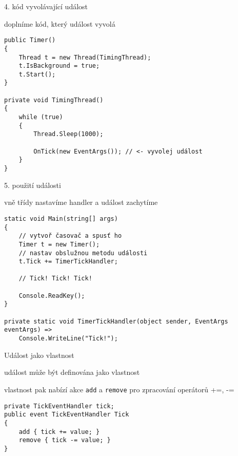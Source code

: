 \begin{frame}[fragile]
\vfill
\begin{bitemize}{4. kód vyvolávající událost}
\item doplníme kód, který událost vyvolá
\end{bitemize}
\vfill
\begin{yesblock}
\begin{lstlisting}
public Timer()
{
    Thread t = new Thread(TimingThread);
    t.IsBackground = true;
    t.Start();
}

private void TimingThread()
{
    while (true)
    {
        Thread.Sleep(1000);

        OnTick(new EventArgs()); // <- vyvolej událost
    }
}
\end{lstlisting}
\end{yesblock}
\vfill
\end{frame}




\begin{frame}[fragile]
\vfill
\begin{bitemize}{5. použití události}
\item vně třídy nastavíme handler a událost zachytíme
\end{bitemize}
\vfill
\begin{yesblock}
\begin{lstlisting}
static void Main(string[] args)
{
	// vytvoř časovač a spusť ho
    Timer t = new Timer();
    // nastav obslužnou metodu události
    t.Tick += TimerTickHandler;

    // Tick! Tick! Tick!

    Console.ReadKey();
}

private static void TimerTickHandler(object sender, EventArgs eventArgs) =>
    Console.WriteLine("Tick!");
\end{lstlisting}
\end{yesblock}
\vfill
\end{frame}





\begin{frame}[fragile]
\vfill
\begin{bitemize}{Událost jako vlastnost}
\item událost může být definována jako vlastnost
\item vlastnost pak nabízí akce \lstinline|add| a \lstinline|remove| pro zpracování operátorů +=, -=
\end{bitemize}
\vfill
\begin{yesblock}
\begin{lstlisting}
private TickEventHandler tick;
public event TickEventHandler Tick
{
    add { tick += value; }
    remove { tick -= value; }
}
\end{lstlisting}
\end{yesblock}
\vfill
\end{frame}
